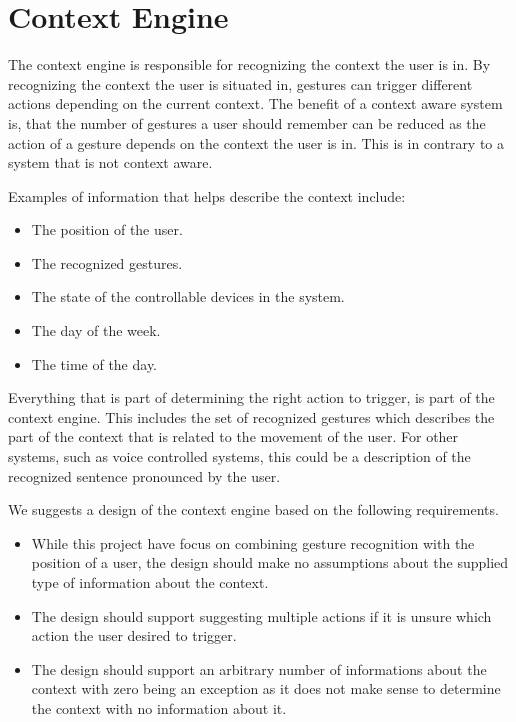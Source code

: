\section{Context Engine}
\label{sec:analysis:context-engine}

The context engine is responsible for recognizing the context the user is in. By recognizing the context the user is situated in, gestures can trigger different actions depending on the current context. The benefit of a context aware system is, that the number of gestures a user should remember can be reduced as the action of a gesture depends on the context the user is in. This is in contrary to a system that is not context aware.

Examples of information that helps describe the context include:

\begin{itemize}
\item The position of the user.
\item The recognized gestures. 
\item The state of the controllable devices in the system.
\item The day of the week.
\item The time of the day.
\end{itemize}

Everything that is part of determining the right action to trigger, is part of the context engine. This includes the set of recognized gestures which describes the part of the context that is related to the movement of the user. For other systems, such as voice controlled systems, this could be a description of the recognized sentence pronounced by the user.


We suggests a design of the context engine based on the following requirements.

\begin{itemize}
\item While this project have focus on combining gesture recognition with the position of a user, the design should make no assumptions about the supplied type of information about the context.
\item The design should support suggesting multiple actions if it is unsure which action the user desired to trigger.
\item The design should support an arbitrary number of informations about the context with zero being an exception as it does not make sense to determine the context with no information about it.
\end{itemize}

